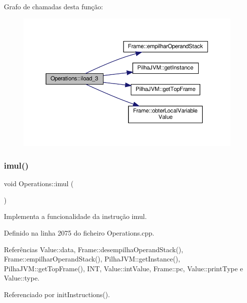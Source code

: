 Grafo de chamadas desta função\+:
\nopagebreak
\begin{figure}[H]
\begin{center}
\leavevmode
\includegraphics[width=350pt]{classOperations_a3f645534291129289ee71c708dbe633c_cgraph}
\end{center}
\end{figure}
\mbox{\label{classOperations_a01b2ffdd380327b31b03657eb99b8a81}} 
\subsubsection{\texorpdfstring{imul()}{imul()}}
{\footnotesize\ttfamily void Operations\+::imul (\begin{DoxyParamCaption}{ }\end{DoxyParamCaption})\hspace{0.3cm}{\ttfamily [private]}}



Implementa a funcionalidade da instrução imul. 



Definido na linha 2075 do ficheiro Operations.\+cpp.



Referências Value\+::data, Frame\+::desempilha\+Operand\+Stack(), Frame\+::empilhar\+Operand\+Stack(), Pilha\+J\+V\+M\+::get\+Instance(), Pilha\+J\+V\+M\+::get\+Top\+Frame(), I\+NT, Value\+::int\+Value, Frame\+::pc, Value\+::print\+Type e Value\+::type.



Referenciado por init\+Instructions().

